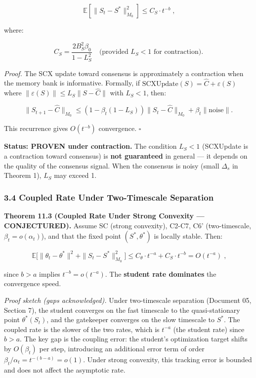 \documentclass[
  12pt,
]{article}
\begin{document}
\[\boxed{\;\mathbb{E}[\|S_t - S^*\|_{M_0}^2] \leq C_S \cdot t^{-b}\;},\]

where:

\[C_S = \frac{2 B_S^2 \beta_0}{1 - L_S^2} \quad \text{(provided } L_S < 1 \text{ for contraction)}.\]

\emph{Proof.} The SCX update toward consensus is approximately a
contraction when the memory bank is informative. Formally, if
\(\text{SCXUpdate}(S) = \hat{C} + \varepsilon(S)\) where
\(\|\varepsilon(S)\| \leq L_S \|S - \hat{C}\|\) with \(L_S < 1\), then:

\[\|S_{t+1} - \hat{C}\|_{M_0} \leq (1 - \beta_t(1 - L_S)) \|S_t - \hat{C}\|_{M_0} + \beta_t \|\text{noise}\|.\]

This recurrence gives \(O(t^{-b})\) convergence. \(\square\)

\textbf{Status: PROVEN under contraction.} The condition \(L_S < 1\)
(SCXUpdate is a contraction toward consensus) is \textbf{not guaranteed}
in general --- it depends on the quality of the consensus signal. When
the consensus is noisy (small \(\Delta_s\) in Theorem 1), \(L_S\) may
exceed 1.

\subsubsection{3.4 Coupled Rate Under Two-Timescale
Separation}\label{coupled-rate-under-two-timescale-separation}

\textbf{Theorem 11.3 (Coupled Rate Under Strong Convexity ---
CONJECTURED).} Assume SC (strong convexity), C2-C7, C6' (two-timescale,
\(\beta_t = o(\alpha_t)\)), and that the fixed point \((S^*, \theta^*)\)
is locally stable. Then:

\[\boxed{\;\mathbb{E}\bigl[\|\theta_t - \theta^*\|^2 + \|S_t - S^*\|_{M_0}^2\bigr] \leq C_\theta \cdot t^{-a} + C_S \cdot t^{-b} = O(t^{-a})\;},\]

since \(b > a\) implies \(t^{-b} = o(t^{-a})\). The \textbf{student rate
dominates} the convergence speed.

\emph{Proof sketch (gaps acknowledged).} Under two-timescale separation
(Document 05, Section 7), the student converges on the fast timescale to
the quasi-stationary point \(\theta^*(S_t)\), and the gatekeeper
converges on the slow timescale to \(S^*\). The coupled rate is the
slower of the two rates, which is \(t^{-a}\) (the student rate) since
\(b > a\). The key gap is the coupling error: the student's optimization
target shifts by \(O(\beta_t)\) per step, introducing an additional
error term of order \(\beta_t / \alpha_t = t^{-(b-a)} = o(1)\). Under
strong convexity, this tracking error is bounded and does not affect the
asymptotic rate.
\end{document}
